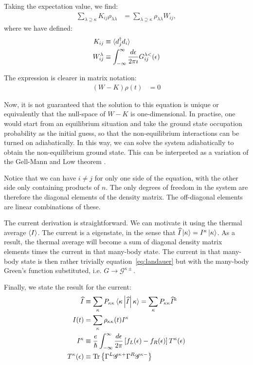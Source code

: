 Taking the expectation value, we find:
\begin{align*}
    \sum_{\lambda\supseteq\kappa} K_{ij} \rho_{\lambda\lambda} &= \sum_{\lambda\supseteq\kappa} \rho_{\lambda\lambda} W_{ij},
\end{align*}
where we have defined:
\begin{align*}
K_{ij} &\equiv \braket{d_j^\dagger d_i} \\
    W^\lambda_{ij} &\equiv   \int^\infty_{-\infty} \frac{d\epsilon}{2\pi\imath} G^{\lambda<}_{ij}(\epsilon) \\
\end{align*}

The expression is clearer in matrix notation:
\begin{align*}
    \left(W-K\right) \rho(t) &= 0
\end{align*}

Now, it is not guaranteed that the solution to this equation is unique or equivalently that the null-space of $W-K$ is one-dimensional. In practise, one would start from an equilibrium situation and take the ground state occupation probability as the initial guess, so that the non-equilibrium interactions can be turned on adiabatically. In this way, we can solve the system adiabatically to obtain the non-equilibrium ground state. This can be interpreted as a variation of the Gell-Mann and Low theorem \cite{gellmannlow, molinari}.

Notice that we can have $i\neq j$ for only one side of the equation, with the other side only containing products of $n$. The only degrees of freedom in the system are therefore the diagonal elements of the density matrix. The off-diagonal elements are linear combinations of these.

The current derivation is straightforward. We can motivate it using the thermal average $\braket{I}$. The current is a eigenstate, in the sense that $ \widehat{I} \ket{\kappa} = I^\kappa \ket{\kappa}$. As a result, the thermal average will become a sum of diagonal density matrix elements times the current in that many-body state. The current in that many-body state is then rather trivially equation~\ref{eq:landauer} but with the many-body Green's function substituted, i.e. $G \rightarrow \mathscr{G}^{\kappa\pm}$.

Finally, we state the result for the current:
\begin{align*}
\widehat{I} &\equiv \sum_\kappa P_{\kappa\kappa} \braket{ \kappa \left|\widehat{I}\right|\kappa}=\sum_\kappa P_{\kappa\kappa} \widehat{I}^k\\ 
I(t) &= \sum_\kappa \rho_{\kappa\kappa}(t) I^\kappa \\
I^\kappa&\equiv \frac{e}{\hslash} \int^\infty_{-\infty} \frac{d\epsilon}{2\pi} \left[ f_L(\epsilon) - f_R (\epsilon) \right] T^\kappa (\epsilon)\\
T^\kappa(\epsilon) &\equiv \text{Tr}\left\{ \Gamma^L \mathscr{G}^{\kappa+} \Gamma^R \mathscr{G}^{\kappa-} \right\}
\end{align*}



